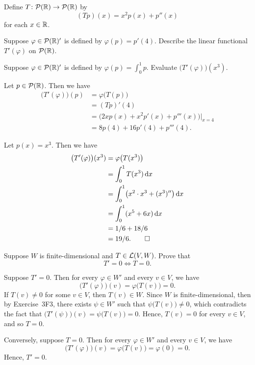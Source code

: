 \begin{exercise}
Define $T\colon\mathcal{P}(\mathbb{R})\to\mathcal{P}(\mathbb{R})$ by
\[ (Tp)(x) = x^2p(x)+p''(x) \]
for each $x\in\mathbb{R}$.
\begin{parts}
\item Suppose $\varphi\in\mathcal{P}(\mathbb{R})'$ is defined by $\varphi(p)=p'(4)$. Describe
  the linear functional $T'(\varphi)$ on $\mathcal{P}(\mathbb{R})$.
\item Suppose $\varphi\in\mathcal{P}(\mathbb{R})'$ is defined by $\varphi(p)=\int_0^1p$.
  Evaluate $\bigl(T'(\varphi)\bigr)(x^3)$.
\end{parts}
\end{exercise}
\begin{solution}\leavevmode
\begin{parts}
\item Let $p\in\mathcal{P}(\mathbb{R})$. Then we have
  \begin{align*}
  \bigl(T'(\varphi)\bigr)(p) &= \varphi\bigl(T(p)\bigr)\\
   &= (Tp)'(4)\\
   &= \bigl(2xp(x)+x^2p'(x)+p'''(x)\bigr)\big|_{x=4}\\
   &= 8p(4)+16p'(4)+p'''(4).
  \end{align*}
\item Let $p(x)=x^3$. Then we have
  \begin{align*}
  \bigl(T'(\varphi)\bigr)(x^3) &= \varphi\bigl(T(x^3)\bigr)\\
   &= \int_0^1 T(x^3)\,\mathrm{d}x\\
   &= \int_0^1 \bigl(x^2\cdot x^3+(x^3)''\bigr)\,\mathrm{d}x\\
   &= \int_0^1 (x^5+6x)\,\mathrm{d}x\\
   &= 1/6+18/6\\
   &= 19/6. \qedhere
  \end{align*}
\end{parts}
\end{solution}

\begin{exercise}
Suppose $W$ is finite-dimensional and $T\in\mathcal{L}(V,W)$. Prove that
\[ T'=0 \iff T=0. \]
\end{exercise}
\begin{solution}
Suppose $T'=0$. Then for every $\varphi\in W'$ and every $v\in V$, we have
\[ \bigl(T'(\varphi)\bigr)(v) = \varphi\bigl(T(v)\bigr) = 0. \]
If $T(v)\ne0$ for some $v\in V$, then $T(v)\in W$. Since $W$ is
finite-dimensional, then by Exercise~3F3, there exists $\psi\in W'$ such that
$\psi\bigl(T(v)\bigr)\ne0$, which contradicts the fact that
$\bigl(T'(\psi)\bigr)(v)=\psi\bigl(T(v)\bigr)=0$. Hence, $T(v)=0$ for every
$v\in V$, and so $T=0$.

Conversely, suppose $T=0$. Then for every $\varphi\in W'$ and every $v\in V$, we
have
\[ \bigl(T'(\varphi)\bigr)(v) = \varphi\bigl(T(v)\bigr) = \varphi(0) = 0. \]
Hence, $T'=0$.
\end{solution}

